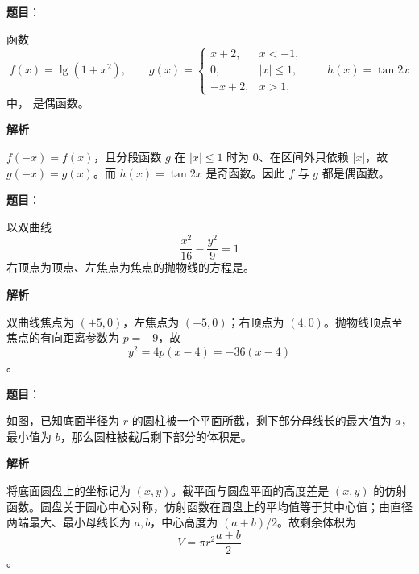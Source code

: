 \begin{answer}

\textbf{题目}：

函数
\nopagebreak[4]
\[
    f(x)=\lg(1+x^2),\qquad
    g(x)=\begin{cases}
    x+2,&x<-1,\\
    0,&|x|\le 1,\\
    -x+2,&x>1,
    \end{cases}
    \qquad h(x)=\tan 2x
\]
    中，\gkblank{} 是偶函数。

\textbf{解析}

\(f(-x)=f(x)\)，且分段函数 \(g\) 在 \(|x|\le1\) 时为 0、在区间外只依赖 \(|x|\)，故 \(g(-x)=g(x)\)。而 \(h(x)=\tan2x\) 是奇函数。因此 \(f\) 与 \(g\) 都是偶函数。


\end{answer}
\begin{answer}

\textbf{题目}：

以双曲线
\nopagebreak[4]
\[
    \frac{x^2}{16}-\frac{y^2}{9}=1
\]
    右顶点为顶点、左焦点为焦点的抛物线的方程是\gkblank{}。

\textbf{解析}

双曲线焦点为 \((\pm5,0)\)，左焦点为 \((-5,0)\)；右顶点为 \((4,0)\)。抛物线顶点至焦点的有向距离参数为 \(p=-9\)，故
\nopagebreak[4]
\[
y^2=4p(x-4)=-36(x-4)
\]
。


\end{answer}
\begin{answer}

\textbf{题目}：

如图，已知底面半径为 \(r\) 的圆柱被一个平面所截，剩下部分母线长的最大值为 \(a\)，最小值为 \(b\)，那么圆柱被截后剩下部分的体积是\gkblank{}。
\nopagebreak[4]
\begin{center}\end{center}
\nopagebreak[4]
\textbf{解析}

将底面圆盘上的坐标记为 \((x,y)\)。截平面与圆盘平面的高度差是 \((x,y)\) 的仿射函数。圆盘关于圆心中心对称，仿射函数在圆盘上的平均值等于其中心值；由直径两端最大、最小母线长为 \(a,b\)，中心高度为 \((a+b)/2\)。故剩余体积为
\nopagebreak[4]
\[
V=\pi r^2\frac{a+b}{2}
\]
。


\end{answer}
